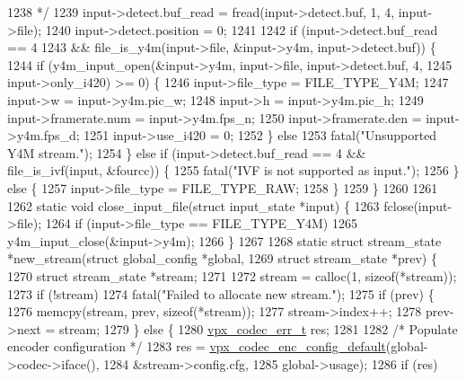 \begin{DoxyCodeInclude}
{{{{{{{{{{{{{{{{{{{{{{{{{{{{{{{{{1238 \textcolor{comment}{   */}
1239   input->detect.buf\_read = fread(input->detect.buf, 1, 4, input->file);
1240   input->detect.position = 0;
1241 
1242   \textcolor{keywordflow}{if} (input->detect.buf\_read == 4
1243       && file\_is\_y4m(input->file, &input->y4m, input->detect.buf)) \{
1244     \textcolor{keywordflow}{if} (y4m\_input\_open(&input->y4m, input->file, input->detect.buf, 4,
1245                        input->only\_i420) >= 0) \{
1246       input->file\_type = FILE\_TYPE\_Y4M;
1247       input->w = input->y4m.pic\_w;
1248       input->h = input->y4m.pic\_h;
1249       input->framerate.num = input->y4m.fps\_n;
1250       input->framerate.den = input->y4m.fps\_d;
1251       input->use\_i420 = 0;
1252     \} \textcolor{keywordflow}{else}
1253       fatal(\textcolor{stringliteral}{"Unsupported Y4M stream."});
1254   \} \textcolor{keywordflow}{else} \textcolor{keywordflow}{if} (input->detect.buf\_read == 4 && file\_is\_ivf(input, &fourcc)) \{
1255     fatal(\textcolor{stringliteral}{"IVF is not supported as input."});
1256   \} \textcolor{keywordflow}{else} \{
1257     input->file\_type = FILE\_TYPE\_RAW;
1258   \}
1259 \}
1260 
1261 
1262 \textcolor{keyword}{static} \textcolor{keywordtype}{void} close\_input\_file(\textcolor{keyword}{struct} input\_state *input) \{
1263   fclose(input->file);
1264   \textcolor{keywordflow}{if} (input->file\_type == FILE\_TYPE\_Y4M)
1265     y4m\_input\_close(&input->y4m);
1266 \}
1267 
1268 \textcolor{keyword}{static} \textcolor{keyword}{struct }stream\_state *new\_stream(\textcolor{keyword}{struct} global\_config *global,
1269                                        \textcolor{keyword}{struct} stream\_state *prev) \{
1270   \textcolor{keyword}{struct }stream\_state *stream;
1271 
1272   stream = calloc(1, \textcolor{keyword}{sizeof}(*stream));
1273   \textcolor{keywordflow}{if} (!stream)
1274     fatal(\textcolor{stringliteral}{"Failed to allocate new stream."});
1275   \textcolor{keywordflow}{if} (prev) \{
1276     memcpy(stream, prev, \textcolor{keyword}{sizeof}(*stream));
1277     stream->index++;
1278     prev->next = stream;
1279   \} \textcolor{keywordflow}{else} \{
1280     \hyperlink{group__codec_gada1084710837ad363b92f2379dd2b8d2}{vpx\_codec\_err\_t}  res;
1281 
1282     \textcolor{comment}{/* Populate encoder configuration */}
1283     res = \hyperlink{group__encoder_ga9ab8c79623312e9c5d5405d66a788f59}{vpx\_codec\_enc\_config\_default}(global->codec->iface(),
1284                                        &stream->config.cfg,
1285                                        global->usage);
1286     \textcolor{keywordflow}{if} (res)
}}}}}}}}}}}}}}}}}}}}}}}}}}}}}}}}}
\end{DoxyCodeInclude}
